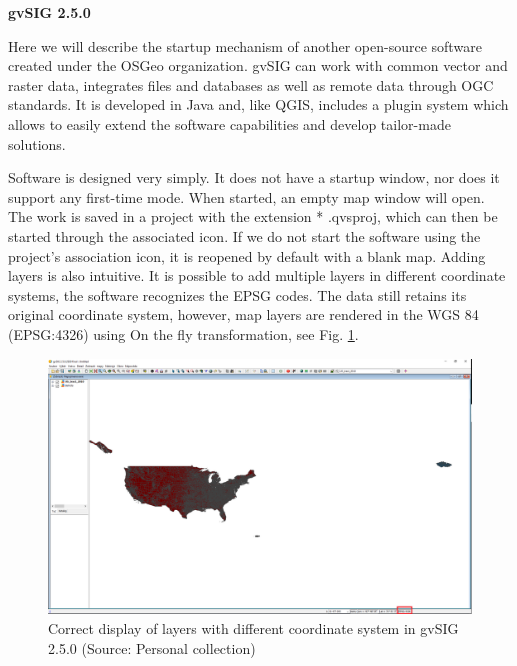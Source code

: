 \documentclass[a4paper,10pt,twoside]{article}
\begin{document}
\newpage
\vspace*{-1cm} 
\bigskip

\noindent \textbf {gvSIG 2.5.0}

\noindent Here we will describe the startup mechanism of another open-source software created under the OSGeo organization. gvSIG can work with common vector and raster data, integrates files and databases as well as remote data through OGC standards. It is developed in Java and, like QGIS, includes a plugin system which allows to easily extend the software capabilities and develop tailor-made solutions.

Software is designed very simply. It does not have a startup window, nor does it support any first-time mode. When started, an empty map window will open. The work is saved in a project with the extension * .qvsproj, which can then be started through the associated icon. If we do not start the software using the project's association icon, it is reopened by default with a blank map. Adding layers is also intuitive. It is possible to add multiple layers in different coordinate systems, the software recognizes the EPSG codes. The data still retains its original coordinate system, however, map layers are rendered in the WGS 84 (EPSG:4326) using On the fly transformation, see Fig. \ref{fig:gvSIG_coords}.

\vspace{0.3cm}
\begin{figure}[hbt!] 
\begin{center}
\includegraphics[width=17cm]{../pictures/gvSIG_coords.PNG} 
\caption[Correct display of layers with different coordinate system in gvSIG 2.5.0]{Correct display of layers with different coordinate system in gvSIG 2.5.0 (Source: Personal collection)}
\label{fig:gvSIG_coords}
\end{center}
\end{figure}
\end{document}
